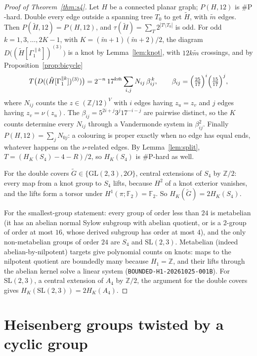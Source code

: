 \documentclass[11pt]{article}
\theoremstyle{definition}
\theoremstyle{remark}
\newcommand{\F}{\mathbb{F}}
\newcommand{\Z}{\mathbb{Z}}
\newcommand{\sharpP}{\#\mathrm{P}}
\begin{document}
\begin{proof}[Proof of Theorem~\ref{thm:s4}]
Let $H$ be a connected planar graph; $P(H,12)$ is $\sharpP$-hard. Double every
edge outside a spanning tree $T_0$ to get $\tilde H$, with $\tilde m$ edges.
Then $P(\tilde H,12)=P(H,12)$, and $\tau(\tilde H)=\sum_T2^{|T\setminus T_0|}$
is odd. For odd $k=1,3,\dots,2K-1$, with $K=(\tilde m+1)(\tilde m+2)/2$, the
diagram $D\bigl((\tilde H[\Gamma_1^{\parallel k}])^{(3)}\bigr)$ is a knot by
Lemma~\ref{lem:knot}, with $12k\tilde m$ crossings, and by
Proposition~\ref{prop:bicycle}
\[
T\bigl(D((\tilde H[\Gamma_1^{\parallel k}])^{(3)})\bigr)=
2^{-n}\,17^{k\tilde m}\sum_{i,j}N_{ij}\,\beta_{ij}^{\,k},
\qquad \beta_{ij}=\Bigl(\tfrac{25}{17}\Bigr)^{i}\Bigl(\tfrac{15}{17}\Bigr)^{j},
\]
where $N_{ij}$ counts the $z\in(\Z/12)^V$ with $i$ edges having $z_u=z_v$ and
$j$ edges having $z_v=\nu(z_u)$. The $\beta_{ij}=5^{2i+j}3^j17^{-i-j}$ are
pairwise distinct, so the $K$ counts determine every $N_{ij}$ through a
Vandermonde system in $\beta_{ij}^2$. Finally
$P(H,12)=\sum_jN_{0j}$: a colouring is proper exactly when no edge has equal
ends, whatever happens on the $\nu$-related edges. By Lemma~\ref{lem:split},
$T=(H_K(S_4)-4-R)/2$, so $H_K(S_4)$ is $\sharpP$-hard as well.

For the double covers $\tilde G\in\{\mathrm{GL}(2,3),2O\}$, central extensions
of $S_4$ by $\Z/2$: every map from a knot group to $S_4$ lifts, because
$H^2$ of a knot exterior vanishes, and the lifts form a torsor under
$H^1(\pi;\F_2)=\F_2$. So $H_K(\tilde G)=2H_K(S_4)$.

For the smallest-group statement: every group of order less than $24$ is
metabelian (it has an abelian normal Sylow subgroup with abelian quotient, or is
a $2$-group of order at most $16$, whose derived subgroup has order at most
$4$), and the only non-metabelian groups of order $24$ are $S_4$ and
$\mathrm{SL}(2,3)$. Metabelian (indeed abelian-by-nilpotent) targets give
polynomial counts on knots: maps to the nilpotent quotient are boundedly many
because $H_1=\Z$, and their lifts through the abelian kernel solve a linear
system (\texttt{BOUNDED-H1-20261025-001B}). For $\mathrm{SL}(2,3)$, a central
extension of $A_4$ by $\Z/2$, the argument for the double covers gives
$H_K(\mathrm{SL}(2,3))=2H_K(A_4)$.
\end{proof}

\section{Heisenberg groups twisted by a cyclic group}\label{sec:heis}
\end{document}
